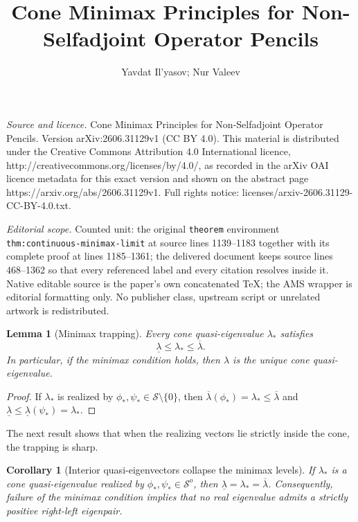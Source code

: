 \documentclass[10pt,a4paper]{amsart}
\newtheorem{corollary}{Corollary}
\newtheorem{lemma}{Lemma}
\begin{document}
\title[Cone Minimax Principles for Non-Selfadjoint Operator Pencils]{Cone Minimax Principles for Non-Selfadjoint Operator Pencils}
\author{Yavdat Il'yasov; Nur Valeev}
\date{}
\maketitle
\noindent\emph{Source and licence.} Cone Minimax Principles for Non-Selfadjoint Operator Pencils. Version arXiv:2606.31129v1 (CC BY 4.0). This material is distributed under the Creative Commons Attribution 4.0 International licence, http://creativecommons.org/licenses/by/4.0/, as recorded in the arXiv OAI licence metadata for this exact version and shown on the abstract page https://arxiv.org/abs/2606.31129v1. Full rights notice: licenses/arxiv-2606.31129-CC-BY-4.0.txt.\par\smallskip
\noindent\textit{Editorial scope.} Counted unit: the original \texttt{theorem} environment \texttt{thm:continuous-minimax-limit} at source lines 1139--1183 together with its complete proof at lines 1185--1361; the delivered document keeps source lines 468--1362 so that every referenced label and every citation resolves inside it. Native editable source is the paper's own concatenated TeX; the AMS wrapper is editorial formatting only. No publisher class, upstream script or unrelated artwork is redistributed.
\begin{lemma}[Minimax trapping]\label{lem:main}
	Every cone quasi-eigenvalue $\lambda_{*}$ satisfies
	\[
	\underline{\lambda} \leq \lambda_{*} \leq \overline{\lambda}.
	\]
	In particular, if the minimax condition holds, then $\hat\lambda$ is the
	unique cone quasi-eigenvalue.
\end{lemma}

\begin{proof}
	If $\lambda_{*}$ is realized by $\phi_{*},\psi_{*}\in\mathcal{S}\setminus\{0\}$,
	then $\overline{\lambda}(\phi_{*})=\lambda_{*}\leq\overline{\lambda}$ and
	$\underline{\lambda}\leq\underline{\lambda}(\psi_{*})=\lambda_{*}$.
\end{proof}

The next result shows that when the realizing vectors lie strictly inside the
cone, the trapping is sharp.

\begin{corollary}[Interior quasi-eigenvectors collapse the minimax levels]
	\label{cor:interior-eigenvalue-collapse}
	If $\lambda_{*}$ is a cone quasi-eigenvalue realized by
	$\phi_{*},\psi_{*}\in\mathcal{S}^{o}$, then
	$\underline{\lambda}=\lambda_{*}=\overline{\lambda}$.
	Consequently, failure of the minimax condition implies that no real eigenvalue
	admits a strictly positive right-left eigenpair.
\end{corollary}
\end{document}
